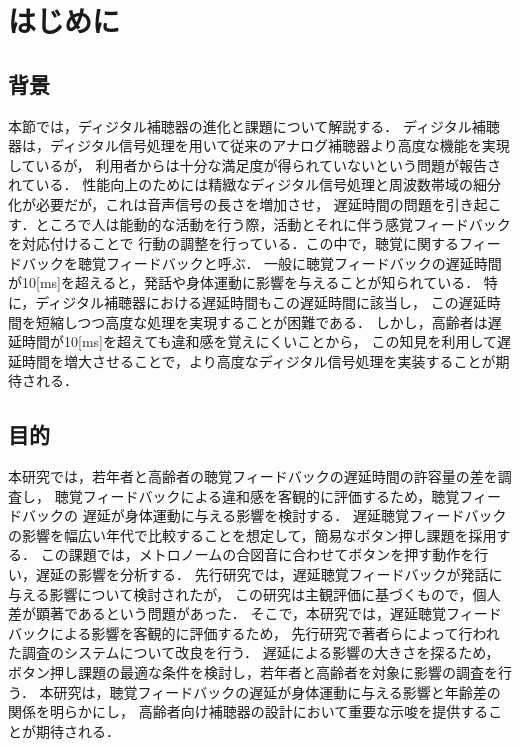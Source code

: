 \section{はじめに}
\subsection{背景}
本節では，ディジタル補聴器の進化と課題について解説する．
ディジタル補聴器は，ディジタル信号処理を用いて従来のアナログ補聴器より高度な機能を実現しているが，
利用者からは十分な満足度が得られていないという問題が報告されている\cite{cf:Manzokudo}．
性能向上のためには精緻なディジタル信号処理と周波数帯域の細分化が必要だが，これは音声信号の長さを増加させ，
遅延時間の問題を引き起こす．ところで人は能動的な活動を行う際，活動とそれに伴う感覚フィードバックを対応付けることで
行動の調整を行っている．この中で，聴覚に関するフィードバックを聴覚フィードバックと呼ぶ\cite{cf:DAF}．
一般に聴覚フィードバックの遅延時間が10[ms]を超えると，発話や身体運動に影響を与えることが知られている\cite{cf:DelayTime-ninnchi}．
特に，ディジタル補聴器における遅延時間もこの遅延時間に該当し，
この遅延時間を短縮しつつ高度な処理を実現することが困難である．
しかし，高齢者は遅延時間が10[ms]を超えても違和感を覚えにくいことから，
この知見を利用して遅延時間を増大させることで，より高度なディジタル信号処理を実装することが期待される．
\subsection{目的}
本研究では，若年者と高齢者の聴覚フィードバックの遅延時間の許容量の差を調査し，
聴覚フィードバックによる違和感を客観的に評価するため，聴覚フィードバックの
遅延が身体運動に与える影響を検討する．
遅延聴覚フィードバックの影響を幅広い年代で比較することを想定して，簡易なボタン押し課題を採用する．
この課題では，メトロノームの合図音に合わせてボタンを押す動作を行い，遅延の影響を分析する．
先行研究\cite{cf:kayama}では，遅延聴覚フィードバックが発話に与える影響について検討されたが，
この研究は主観評価に基づくもので，個人差が顕著であるという問題があった．
そこで，本研究では，遅延聴覚フィードバックによる影響を客観的に評価するため，
先行研究\cite{cf:shigematu}で著者らによって行われた調査のシステムについて改良を行う．
遅延による影響の大きさを探るため，ボタン押し課題の最適な条件を検討し，若年者と高齢者を対象に影響の調査を行う．
本研究は，聴覚フィードバックの遅延が身体運動に与える影響と年齢差の関係を明らかにし，
高齢者向け補聴器の設計において重要な示唆を提供することが期待される．
